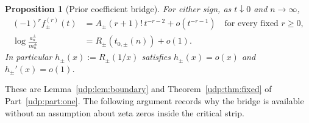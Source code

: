 \documentclass[11pt]{article}
\newtheorem{proposition}[theorem]{Proposition}
\theoremstyle{remark}\newtheorem{remark}[theorem]{Remark}
\numberwithin{equation}{section}
\begin{document}
\begin{proposition}[Prior coefficient bridge]\label{udp:tw:prop:bridge}
For either sign, as $t\downarrow0$ and $n\to\infty$,
\begin{align}
 (-1)^rf_\pm^{(r)}(t)
 &=A_\pm(r+1)!\,t^{-r-2}+o(t^{-r-1})
 \quad\text{for every fixed }r\ge0,\label{udp:tw:eq:derivative}\\
 \log\frac{a_n^\pm}{m_n^\pm}
 &=R_\pm(t_{0,\pm}(n))+o(1).\label{udp:tw:eq:bridge}
\end{align}
In particular $h_\pm(x):=R_\pm(1/x)$ satisfies
$h_\pm(x)=o(x)$ and $h_\pm'(x)=o(1)$.
\end{proposition}

These are Lemma~\ref{udp:lem:boundary} and Theorem~\ref{udp:thm:fixed} of Part~\ref{udp:part:one}.
The following argument records why the bridge is available without an
assumption about zeta zeros inside the critical strip.
\end{document}
